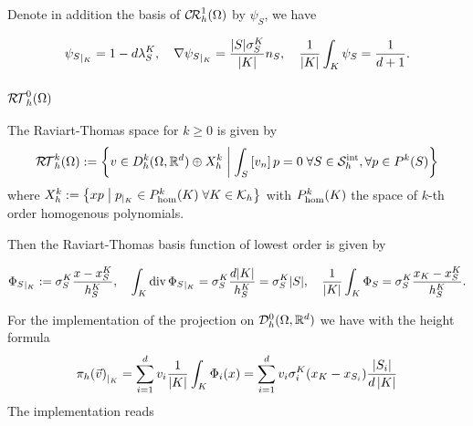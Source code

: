 Denote in addition the basis of $\mathcal{C\!R}^1_h(\Omega)$ by $\psi_S$, we have
%
\begin{yellowbox}
\begin{equation}\label{eq:}
{\psi_S}_{|_{K}} = 1- d \lambda_S^K, \quad \nabla {\psi_S}_{|_{K}} =
\frac{|S|\sigma_{S}^K}{|K|}n_S,\quad \frac{1}{|K|}\int_K \psi_S = \frac{1}{d+1}.
\end{equation}
\end{yellowbox}%
%


%
\subsubsection{$\mathcal{R\!T}^0_h(\Omega)$}
%

The Raviart-Thomas space for $k\ge0$ is given by
%
\begin{equation}\label{eq:}
\mathcal{R\!T}^k_h(\Omega):= \left\{v\in D^k_h(\Omega,\mathbb R^d)\oplus X^k_h\;\middle|\;\int_S\left[v_n\right]p=0\;\forall S\in\mathcal S^{\rm int}_h,\forall p\in P^{k}(S)\right\}
\end{equation}
%
where $X^k_h:=\left\{xp\;\middle|\;{p}_{|_{K}}\in P_{\rm hom}^{k}(K)\; \forall K\in\mathcal K_h\right\}$ with $P_{\rm hom}^{k}(K)$ the space of $k$-th order homogenous polynomials.

Then the Raviart-Thomas basis function of lowest order is given by
%
\begin{yellowbox}
\begin{equation}\label{eq:BasisFctRt}
{\Phi_S}_{|_{K}} := \sigma_{S}^K \frac{x-x_S^K}{h_S^K},\quad 
\int_K \operatorname{div} {\Phi_S}_{|_{K}} = \sigma_{S}^K \frac{d|K|}{h_S^K}=  \sigma_{S}^K|S|,\quad \frac{1}{|K|}\int_K \Phi_S = \sigma_{S}^K\frac{x_K - x_S^K}{h_S^K}.
\end{equation}
\end{yellowbox}
%
For the  implementation of the projection on $\mathcal{D}_h^0(\Omega,\mathbb R^d)$ we have with the height formula
%
\begin{align*}
{\pi_h(\vec{v})}_{|_{K}} =  \sum_{i=1}^d v_i \frac{1}{\left|K\right|}\int_K \Phi_i(x) =  \sum_{i=1}^d v_i \sigma_{i}^K(x_K - x_{S_i})\frac{\left|S_i\right|}{d\left|K\right|}
\end{align*}
%
The  implementation reads
\begin{lstlisting}
\end{lstlisting}
%


%
